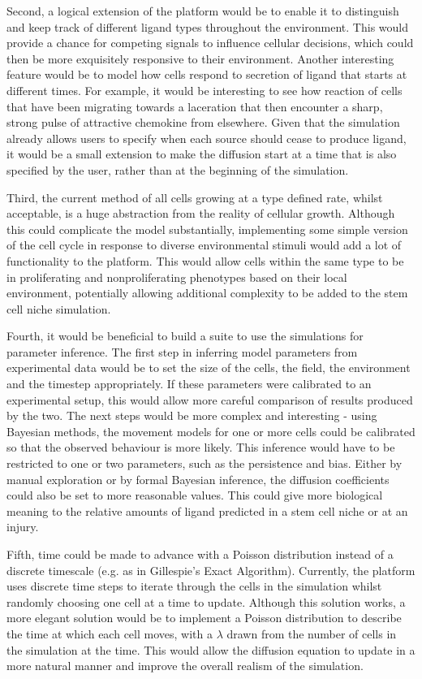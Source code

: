 \documentclass[12pt]{article}
\begin{document}
Second, a logical extension of the platform would be to enable it to 
distinguish and keep track of different ligand types throughout the 
environment. This would provide a chance for competing signals to 
influence cellular decisions, which could then be more exquisitely 
responsive to their environment. Another interesting feature would be to 
model how cells respond to secretion of ligand that starts at different 
times. For example, it would be interesting to see how reaction of cells 
that have been migrating towards a laceration that then encounter a 
sharp, strong pulse of attractive chemokine from elsewhere. Given that 
the simulation already allows users to specify when each source should 
cease to produce ligand, it would be a small extension to make the 
diffusion start at a time that is also specified by the user, rather 
than at the beginning of the simulation. 

Third, the current method of all cells growing at a type defined rate, 
whilst acceptable, is a huge abstraction from the reality of cellular 
growth. Although this could complicate the model substantially, 
implementing some simple version of the cell cycle in response to 
diverse environmental stimuli would add a lot of functionality to the 
platform. This would allow cells within the same type to be in 
proliferating and nonproliferating phenotypes based on their local 
environment, potentially allowing additional complexity to be added to 
the stem cell niche simulation.

Fourth, it would be beneficial to build a suite to use the simulations 
for parameter inference. The first step in inferring model parameters 
from experimental data would be to set the size of the cells, the field, 
the environment and the timestep appropriately. If these parameters were 
calibrated to an experimental setup, this would allow more careful 
comparison of results produced by the two. The next steps would be more 
complex and interesting - using Bayesian methods, the movement models 
for one or more cells could be calibrated so that the observed behaviour 
is more likely. This inference would have to be restricted to one or two 
parameters, such as the persistence and bias. Either by manual 
exploration or by formal Bayesian inference, the diffusion coefficients 
could also be set to more reasonable values. This could give more 
biological meaning to the relative amounts of ligand predicted in a stem 
cell niche or at an injury.

Fifth, time could be made to advance with a Poisson distribution instead 
of a discrete timescale (e.g. as in Gillespie's Exact Algorithm). 
Currently, the platform uses discrete time steps to iterate through the 
cells in the simulation whilst randomly choosing one cell at a time to 
update. Although this solution works, a more elegant solution would be 
to implement a Poisson distribution to describe the time at which each 
cell moves, with a \(\lambda\) drawn from the number of cells in the simulation at 
the time. This would allow the diffusion equation to update in a more 
natural manner and improve the overall realism of the simulation.
\end{document}
